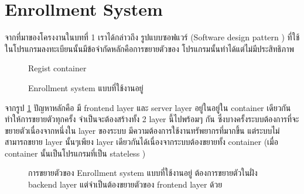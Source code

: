\section {Enrollment System}

จากที่มาของโครงงานในบทที่ 1 เราได้กล่าวถึง รูปแบบซอฟแวร์ (Software design pattern \cite{sdp}) ที่ใช้ในโปรแกรมลงทะเบียนนั้นมีข้อจำกัดหลักคือการขยายตัวของ โปรแกรมนั้นทำได้แต่ไม่มีประสิทธิภาพ

\begin{figure}[h]
    \centering
    \begin{center}
    Regist container \\
    \end{center}
    \caption[Poem]{Enrollment system แบบที่ใช้งานอยู่}
    \label{fig:old_regist_system}
\end{figure}

จากรูป \ref{fig:old_regist_system} ปัญหาหลักคือ มี frontend layer และ server layer อยู่ในอยู่ใน container เดียวกันทำให้การขยายตัวทุกครั้ง จำเป็นจะต้องสร้างทั้ง 2 layer นี้ไปพร้อมๆ กัน ซึ่งบางครั้งระบบต้องการที่จะขยายตัวเนื่องจากหนึ่งใน layer ของระบบ มีความต้องการใช้งานทรัพยากรที่มากขึ้น แต่ระบบไม่สามารถขยาย layer นั้นๆเพียง layer เดียวกันได้เนื่องจากระบบต้องขยายทั้ง container (เมื่อ container นั้นเป็นโปรแกรมที่เป็น stateless \cite{slsf})

\begin{figure}[h]
    \centering
    \begin{center}
    \end{center}
    \caption[Poem]{การขยายตัวของ Enrollment system แบบที่ใช้งานอยู่ ต้องการขยายตัวในฝั่ง backend layer แต่จำเป็นต้องขยายตัวของ frontend layer ด้วย}
    \label{fig:scaling_old_regist_system}
\end{figure}

